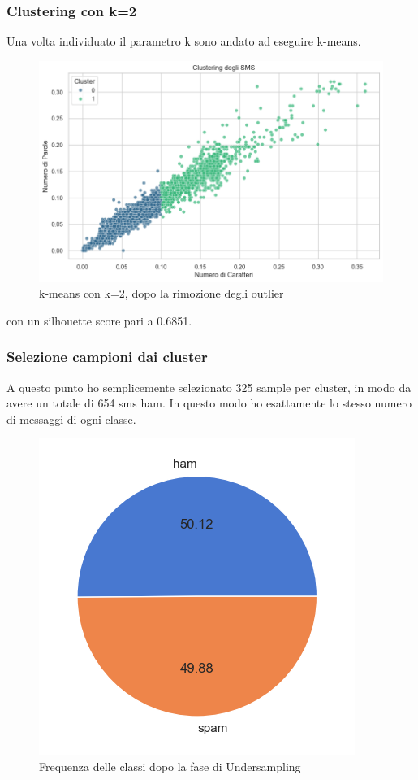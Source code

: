 \documentclass[]{article}
\begin{document}
            \subsubsection{Clustering con k=2}
                Una volta individuato il parametro k sono andato ad eseguire k-means.
                \begin{figure}[H]
                    \centering
                    \includegraphics[width=0.9\linewidth]{images/clust.png}
                    \caption{k-means con k=2, dopo la rimozione degli outlier}
                    \label{fig:enter-label}
                \end{figure}
                con un silhouette score pari a 0.6851.

            \subsubsection{Selezione campioni dai cluster}
                A questo punto ho semplicemente selezionato 325 sample per cluster, in modo da avere un totale di 654 sms ham. In questo modo ho esattamente lo stesso numero di messaggi di ogni classe.
                \begin{figure}[H]
                    \centering
                    \includegraphics[width=0.5\linewidth]{images/datasetBilanciato.png}
                    \caption{Frequenza delle classi dopo la fase di Undersampling}
                    \label{fig:enter-label}
                \end{figure}
\end{document}

